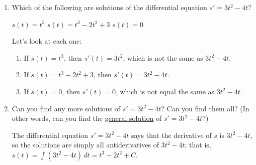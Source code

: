 \documentclass[main]{subfiles}
\begin{document}
\begin{enumerate}[resume]
\begin{enumerate}
    \begin{solution}
        If $s(t)$ is the bug's position, then $\frac{ds}{dt}$ is the bug's
        velocity.
      The fact that the equation involves $s'$ tells us that $s$ is the
      function we're looking for; the fact that the other variable in the
      equation is $t$ tells us that $s$ must be a function of $t$. 
    \end{solution}

  \item

    \begin{problem}
      Which of the following are solutions of the differential equation
      $s' = 3t^2-4t$?
       \raggedcolumns
        \begin{enumerate} [label=\protect{\maybecircle{\Alph*.}}, itemsep=0.2cm]
        \plainitem $s(t)=t^3$
        \circleitem $s(t)=t^3-2t^2+3$
        \plainitem $s(t)=0$
        \end{enumerate}      
            
    \end{problem}

    \begin{solution}
      Let's look at each one:
      \begin{enumerate}[label=\Alph*.]
      \item If $s(t) = t^3$, then $s'(t) = 3t^2$,
      which is not the same as $3t^2
        - 4t$.
      \item If $s(t) = t^3 - 2t^2 + 3$, then $s'(t) = 3t^2 - 4t$.
      \item If $s(t) = 0$, then $s'(t) = 0$, which is not equal the same as
        $3t^2 - 4t$. 
      \end{enumerate}
    \end{solution}

  \item


    \begin{problem}[\vfill]
      Can you find any more solutions of $s' = 3t^2 - 4t$?  Can you find
      them all?  (In other words, can you find the \uline{general
        solution} of $s' = 3t^2 - 4t$?)
    \end{problem}

    \begin{solution}
      The differential equation $s' = 3t^2 - 4t$ says that the derivative
      of $s$ is $3t^2 - 4t$, so the solutions are simply all
      antiderivatives of $3t^2 - 4t$; that is, $s(t) =
      \displaystyle \int (3t^2 - 4t)\,dt = \boxed{t^3 - 2t^2 + C}$. 
    \end{solution}


\end{enumerate}
\end{enumerate}
\end{document}
